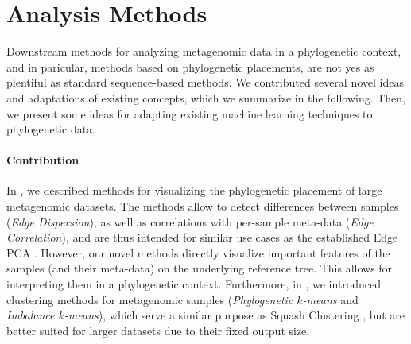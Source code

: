 
\section{Analysis Methods}
\label{ch:ConclusionOutlook:sec:AnalysisMethods}

Downstream methods for analyzing metagenomic data in a phylogenetic context,
and in paricular, methods based on phylogenetic placements,
are not yes as plentiful as standard sequence-based methods.
We contributed several novel ideas and adaptations of existing concepts,
which we summarize in the following.
Then, we present some ideas for adapting existing machine learning techniques to phylogenetic data.

\paragraph{Contribution}
\label{ch:ConclusionOutlook:sec:AnalysisMethods:par:Contribution}

In , we described methods for visualizing the phylogenetic placement of large metagenomic datasets.
The methods allow to detect differences between samples (\emph{Edge Dispersion}),
as well as correlations with per-sample meta-data (\emph{Edge Correlation}),
and are thus intended for similar use cases as the established Edge PCA \citep{Matsen2011a}.
However, our novel methods directly visualize important features of the samples (and their meta-data)
on the underlying reference tree.
This allows for interpreting them in a phylogenetic context.
Furthermore, in , we introduced clustering methods for metagenomic samples
(\emph{Phylogenetic $k$-means} and \emph{Imbalance $k$-means}),
which serve a similar purpose as Squash Clustering \citep{Matsen2011a},
but are better suited for larger datasets due to their fixed output size.

